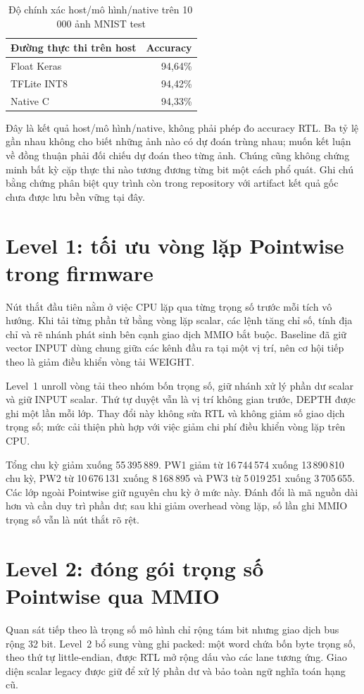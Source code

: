 \begin{table}[!ht]
\renewcommand{\arraystretch}{1.12}
\centering
\caption{Độ chính xác host/mô hình/native trên 10\,000 ảnh MNIST test}
\label{tab:host-accuracy}
\begin{tabular}{lr}
\hline
Đường thực thi trên host & Accuracy \\
\hline
Float Keras & 94,64\% \\
TFLite INT8 & 94,42\% \\
Native C & 94,33\% \\
\hline
\end{tabular}
\end{table}
Đây là kết quả host/mô hình/native, không phải phép đo accuracy RTL. Ba tỷ lệ gần nhau không cho biết những ảnh nào có dự đoán trùng nhau; muốn kết luận về đồng thuận phải đối chiếu dự đoán theo từng ảnh. Chúng cũng không chứng minh bất kỳ cặp thực thi nào tương đương từng bit một cách phổ quát. Ghi chú bằng chứng phân biệt quy trình còn trong repository với artifact kết quả gốc chưa được lưu bền vững tại đây.

\section{Level 1: tối ưu vòng lặp Pointwise trong firmware}
Nút thắt đầu tiên nằm ở việc CPU lặp qua từng trọng số trước mỗi tích vô hướng. Khi tải từng phần tử bằng vòng lặp scalar, các lệnh tăng chỉ số, tính địa chỉ và rẽ nhánh phát sinh bên cạnh giao dịch MMIO bắt buộc. Baseline đã giữ vector INPUT dùng chung giữa các kênh đầu ra tại một vị trí, nên cơ hội tiếp theo là giảm điều khiển vòng tải WEIGHT.

Level~1 unroll vòng tải theo nhóm bốn trọng số, giữ nhánh xử lý phần dư scalar và giữ INPUT scalar. Thứ tự duyệt vẫn là vị trí không gian trước, DEPTH được ghi một lần mỗi lớp. Thay đổi này không sửa RTL và không giảm số giao dịch trọng số; mức cải thiện phù hợp với việc giảm chi phí điều khiển vòng lặp trên CPU.

Tổng chu kỳ giảm xuống 55\,395\,889. PW1 giảm từ 16\,744\,574 xuống 13\,890\,810 chu kỳ, PW2 từ 10\,676\,131 xuống 8\,168\,895 và PW3 từ 5\,019\,251 xuống 3\,705\,655. Các lớp ngoài Pointwise giữ nguyên chu kỳ ở mức này. Đánh đổi là mã nguồn dài hơn và cần duy trì phần dư; sau khi giảm overhead vòng lặp, số lần ghi MMIO trọng số vẫn là nút thắt rõ rệt.

\section{Level 2: đóng gói trọng số Pointwise qua MMIO}
Quan sát tiếp theo là trọng số mô hình chỉ rộng tám bit nhưng giao dịch bus rộng 32 bit. Level~2 bổ sung vùng ghi packed: một word chứa bốn byte trọng số, theo thứ tự little-endian, được RTL mở rộng dấu vào các lane tương ứng. Giao diện scalar legacy được giữ để xử lý phần dư và bảo toàn ngữ nghĩa toán hạng cũ.

